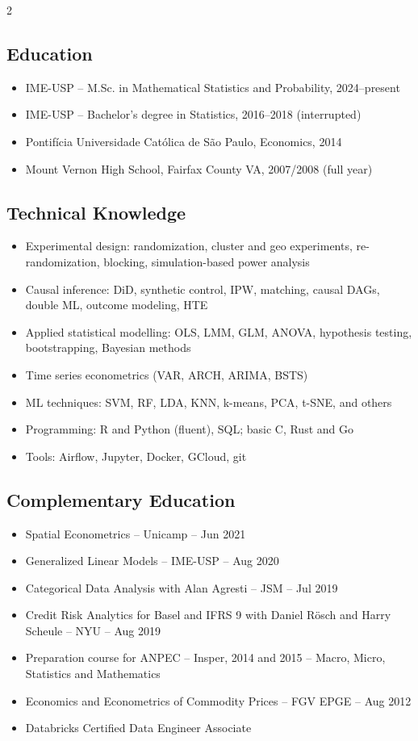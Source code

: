 \documentclass{article}
\begin{document}
\begin{multicols}{2}
\normalsize

\subsection{Education}
\begin{itemize}
\item{IME-USP – M.Sc. in Mathematical Statistics and Probability, 2024--present}
\item{IME-USP – Bachelor's degree in Statistics, 2016--2018 (interrupted)}
\item{Pontifícia Universidade Católica de São Paulo, Economics, 2014}
\item{Mount Vernon High School, Fairfax County VA, 2007/2008 (full year)}
\end{itemize}

\subsection{Technical Knowledge}
\begin{itemize}
\item{Experimental design: randomization, cluster and geo experiments, re-randomization, blocking, simulation-based power analysis}
\item{Causal inference: DiD, synthetic control, IPW, matching, causal DAGs, double ML, outcome modeling, HTE}
\item{Applied statistical modelling: OLS, LMM, GLM, ANOVA, hypothesis testing, bootstrapping, Bayesian methods}
\item{Time series econometrics (VAR, ARCH, ARIMA, BSTS)}
\item{ML techniques: SVM, RF, LDA, KNN, k-means, PCA, t-SNE, and others}
\item{Programming: R and Python (fluent), SQL; basic C, Rust and Go}
\item{Tools: Airflow, Jupyter, Docker, GCloud, git}
\end{itemize}

\subsection{Complementary Education}
\begin{itemize}
\item{Spatial Econometrics – Unicamp – Jun 2021}
\item{Generalized Linear Models – IME-USP – Aug 2020}
\item{Categorical Data Analysis with Alan Agresti – JSM – Jul 2019}
\item{Credit Risk Analytics for Basel and IFRS 9 with Daniel Rösch and Harry Scheule – NYU – Aug 2019}
\item{Preparation course for ANPEC – Insper, 2014 and 2015 – Macro, Micro, Statistics and Mathematics}
\item{Economics and Econometrics of Commodity Prices – FGV EPGE – Aug 2012}
\item{Databricks Certified Data Engineer Associate}
\end{itemize}


\end{multicols}
\end{document}
